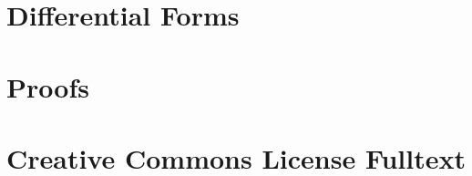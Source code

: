 \documentclass[letter, 11pt, onesided]{memoir}
\renewcommand{\chapnumfont}{\normalfont\huge\sffamily\bfseries}
\renewcommand{\printchaptername}{\chapnumfont Chapter}
\numberwithin{dummy}{section}
\theoremstyle{orangenumbox}
\theoremstyle{ocrenumbox}
\theoremstyle{blacknumex}
\theoremstyle{blacknumbox}
\theoremstyle{ocrenum}
\begin{document}
\chapter{Differential Forms}
	
	\clearpage

\appendix
\renewcommand{\printchaptername}{\chapnumfont Appendix}
\chapter{Proofs}
	\label{APPENDIX-proofstyle}
	

\chapter{Creative Commons License Fulltext}
	\label{APPENDIX-license}
	

\backmatter


% 
% 
\end{document}
